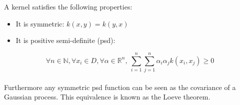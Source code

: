 \documentclass{beamer}
\begin{document}
\begin{frame}{}
A kernel satisfies the following properties:
\begin{itemize}
	\item It is symmetric: $k(x,y) = k(y,x)$
	\item It is positive semi-definite (psd):
\end{itemize}
\begin{equation*}
	\forall n \in \mathds{N}, \forall x_i \in D, \forall \alpha \in \mathds{R}^n,\  \sum_{i=1}^n \sum_{j=1}^n \alpha_i \alpha_j k(x_i,x_j) \geq 0
\end{equation*}
\vspace{5mm} \\
Furthermore any symmetric psd function can be seen as the covariance of a Gaussian process. This equivalence is known as the Loeve theorem.
\end{frame}
\end{document}
